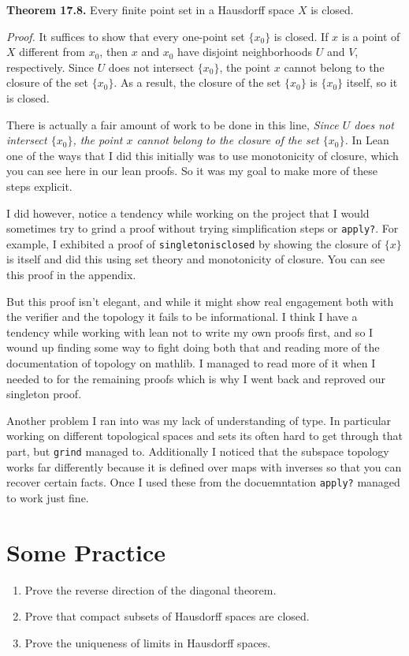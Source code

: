 \documentclass[11pt]{article}
\begin{document}
\textbf{Theorem 17.8.} Every finite point set in a Hausdorff space $X$ is closed.

\textit{Proof.} It suffices to show that every one-point set $\{x_0\}$ is closed. 
If $x$ is a point of $X$ different from $x_0$, then $x$ and $x_0$ have disjoint neighborhoods $U$ and $V$, respectively. 
Since $U$ does not intersect $\{x_0\}$, the point $x$ cannot belong to the closure of the set $\{x_0\}$. 
As a result, the closure of the set $\{x_0\}$ is $\{x_0\}$ itself, so it is closed.

There is actually a fair amount of work to be done in this line, \emph{Since $U$ does not intersect $\{x_0\}$, the point $x$ cannot belong to the closure of the set $\{x_0\}$.} In Lean one of the ways that I did this initially was to use monotonicity of closure, which you can see here in our lean proofs. So it was my goal to make more of these steps explicit.

I did however, notice a tendency while working on the project that I would sometimes try to grind a proof without trying simplification steps or \verb|apply?|. For example, I exhibited a proof of \verb|singletonisclosed| by showing the closure of $\{x\}$ is itself and did this using set theory and monotonicity of closure. You can see this proof in the appendix.  

But this proof isn't elegant, and while it might show real engagement both with the verifier and the topology it fails to be informational. I think I have a tendency while working with lean not to write my own proofs first, and so I wound up finding some way to fight doing both that and reading more of the documentation of topology on mathlib. I managed to read more of it when I needed to for the remaining proofs which is why I went back and reproved our singleton proof.

Another problem I ran into was my lack of understanding of type. In particular working on different topological spaces and sets its often hard to get through that part, but \verb|grind| managed to. Additionally I noticed that the subspace topology works far differently because it is defined over maps with inverses so that you can recover certain facts. Once I used these from the docuemntation \verb|apply?| managed to work just fine. 

\section{Some Practice}

\begin{enumerate}
  \item Prove the reverse direction of the diagonal theorem.
  \item Prove that compact subsets of Hausdorff spaces are closed.
  \item Prove the uniqueness of limits in Hausdorff spaces.
\end{enumerate}
\end{document}
